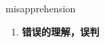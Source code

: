 
\begin{frame}
{\huge misapprehension}
\begin{center}
\begin{enumerate}\Large
  \item \textbf{错误的理解，误判}
\end{enumerate}
\end{center}
\end{frame}
